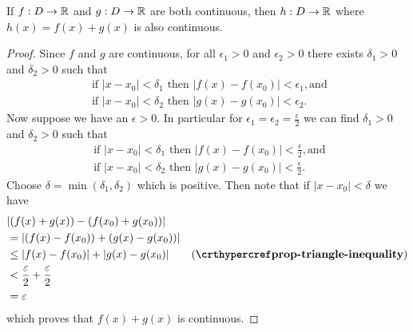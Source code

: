 \begin{proposition}\label{prop-sum-of-continuous-functions-is-continuous}
    If $f: D \to \mathbb{R}$ and $g: D \to \mathbb{R}$ are both continuous, then $h: D \to \mathbb{R}$ where $h(x) = f(x) + g(x)$ is also continuous.
\end{proposition}
\begin{proof}
    Since $f$ and $g$ are continuous, for all $\epsilon_1 > 0$ and $\epsilon_2 > 0$ there exists $\delta_1 > 0$ and $\delta_2 > 0$ such that
    \begin{gather*}
        \text{ if } |x - x_0| < \delta_1 \text{ then } |f(x) - f(x_0)| < \epsilon_1, \text{and}\\
        \text{ if } |x - x_0| < \delta_2 \text{ then } |g(x) - g(x_0)| < \epsilon_2.
    \end{gather*}
    Now suppose we have an $\epsilon > 0$. In particular for $\epsilon_1 = \epsilon_2 = \frac\epsilon2$ we can find $\delta_1 > 0$ and $\delta_2 > 0$ such that
    \begin{gather*}
        \text{ if } |x - x_0| < \delta_1 \text{ then } |f(x) - f(x_0)| < \frac\epsilon2, \text{and}\\
        \text{ if } |x - x_0| < \delta_2 \text{ then } |g(x) - g(x_0)| < \frac\epsilon2.
    \end{gather*}
    Choose $\delta = \min(\delta_1, \delta_2)$ which is positive. Then note that if $|x - x_0| < \delta$ we have
    \begin{align*}
        &|(f(x) + g(x)) - (f(x_0) + g(x_0))|\\
        &= |(f(x) - f(x_0)) + (g(x) - g(x_0))|\\
        &\leq |f(x) - f(x_0)| + |g(x) - g(x_0)| & (\myref{prop-triangle-inequality})\\
        &< \frac\epsilon2 + \frac\epsilon2\\
        &= \epsilon
    \end{align*}
    which proves that $f(x) + g(x)$ is continuous.
\end{proof}

